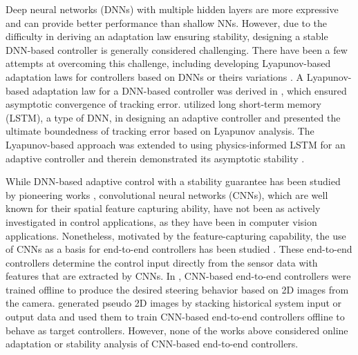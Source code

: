 \documentclass[letterpaper, 10 pt, conference]{ieeeconf}  %
\begin{document}
Deep neural networks (DNNs) with multiple hidden layers are more expressive and can provide better performance than shallow NNs. However, due to the difficulty in deriving an adaptation law ensuring stability, designing a stable DNN-based controller is generally considered challenging. There have been a few attempts at overcoming this challenge, including developing Lyapunov-based adaptation laws for controllers based on DNNs or theirs variations \cite{DixonDNN,DixonLSTM,DixonPINN}. A Lyapunov-based adaptation law for a DNN-based controller was derived in \cite{DixonDNN}, which ensured asymptotic convergence of tracking error. \cite{DixonLSTM} utilized long short-term memory (LSTM), a type of DNN, in designing an adaptive controller and presented the ultimate boundedness of tracking error based on Lyapunov analysis.
The Lyapunov-based approach was extended to using physics-informed LSTM for an adaptive controller and therein demonstrated its asymptotic stability \cite{DixonPINN}.

While DNN-based adaptive control with a stability guarantee has been studied by pioneering works \cite{DixonDNN,DixonLSTM,DixonPINN}, convolutional neural networks (CNNs), which are well known for their spatial feature capturing ability, have not been as actively investigated in control applications, as they have been in computer vision applications.
Nonetheless, motivated by the feature-capturing capability, the use of CNNs as a basis for end-to-end controllers has been studied \cite{CNNimg2strOutErr,CNNimg2strAngErr,CNNmat2mat,CNNsensorSystemCompare}. These end-to-end controllers determine the control input directly from the sensor data with features that are extracted by CNNs. In \cite{CNNimg2strOutErr,CNNimg2strAngErr}, CNN-based end-to-end controllers were trained offline to produce the desired steering behavior based on 2D images from the camera. \cite{CNNmat2mat,CNNsensorSystemCompare} generated pseudo 2D images by stacking historical system input or output data and used them to train CNN-based end-to-end controllers offline to behave as target controllers.
However, none of the works above considered online adaptation or stability analysis of CNN-based end-to-end controllers. 
\end{document}
